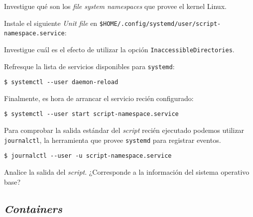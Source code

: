 \begin{questions}
  \question Investigue qué son los \textit{file system namespaces} que
  provee el kernel Linux.

  \question Instale el siguiente \textit{Unit file} en
  \texttt{\$HOME/.config/systemd/user/script-namespace.service}:

  

  \question Investigue cuál es el efecto de utilizar la opción
  \texttt{InaccessibleDirectories}.

    \question Refresque la lista de servicios disponibles para
  \texttt{systemd}:
  \begin{verbatim}
$ systemctl --user daemon-reload
\end{verbatim}

    \question Finalmente, es hora de arrancar el servicio recién configurado:
\begin{verbatim}
$ systemctl --user start script-namespace.service
\end{verbatim}

    \question Para comprobar la salida estándar del \textit{script} recién
    ejecutado podemos utilizar \texttt{journalctl}, la herramienta que
    provee \texttt{systemd} para registrar eventos.
\begin{verbatim}
$ journalctl --user -u script-namespace.service
\end{verbatim}

    Analice la salida del \textit{script}. ¿Corresponde a la información
    del sistema operativo base?

\end{questions}

\subsection{\textit{Containers}}